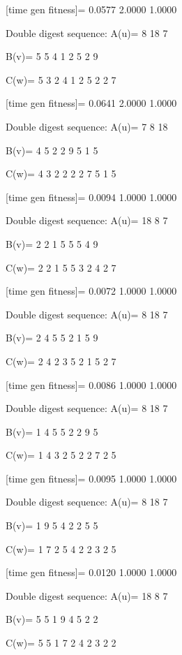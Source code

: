 [time gen fitness]=
    0.0577    2.0000    1.0000

Double digest sequence:
A(u)=
     8    18     7

B(v)=
     5     5     4     1     2     5     2     9

C(w)=
     5     3     2     4     1     2     5     2     2     7

[time gen fitness]=
    0.0641    2.0000    1.0000

Double digest sequence:
A(u)=
     7     8    18

B(v)=
     4     5     2     2     9     5     1     5

C(w)=
     4     3     2     2     2     2     7     5     1     5

[time gen fitness]=
    0.0094    1.0000    1.0000

Double digest sequence:
A(u)=
    18     8     7

B(v)=
     2     2     1     5     5     5     4     9

C(w)=
     2     2     1     5     5     3     2     4     2     7

[time gen fitness]=
    0.0072    1.0000    1.0000

Double digest sequence:
A(u)=
     8    18     7

B(v)=
     2     4     5     5     2     1     5     9

C(w)=
     2     4     2     3     5     2     1     5     2     7

[time gen fitness]=
    0.0086    1.0000    1.0000

Double digest sequence:
A(u)=
     8    18     7

B(v)=
     1     4     5     5     2     2     9     5

C(w)=
     1     4     3     2     5     2     2     7     2     5

[time gen fitness]=
    0.0095    1.0000    1.0000

Double digest sequence:
A(u)=
     8    18     7

B(v)=
     1     9     5     4     2     2     5     5

C(w)=
     1     7     2     5     4     2     2     3     2     5

[time gen fitness]=
    0.0120    1.0000    1.0000

Double digest sequence:
A(u)=
    18     8     7

B(v)=
     5     5     1     9     4     5     2     2

C(w)=
     5     5     1     7     2     4     2     3     2     2

